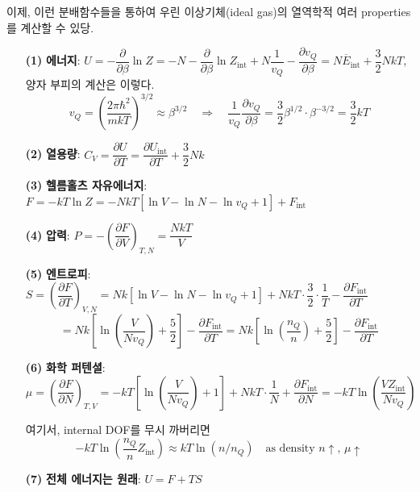 \documentclass{article}
\begin{document}
\noindent
이제, 이런 분배함수들을 통하여 우린 이상기체(ideal gas)의 열역학적 여러 properties를 계산할 수 있당.
\begin{enumerate}
    \item[\textbf{(1)}] \textbf{에너지}: $U = -\dfrac{\partial }{\partial \beta} \ln Z  = -N -\dfrac{\partial }{\partial \beta} \ln Z_{\text{int}} + N\dfrac{1}{v_Q} -\dfrac{\partial v_Q}{\partial \beta} = N \overline{E}_{\text{int}} + \dfrac{3}{2}NkT$, 양자 부피의 계산은 이렇다.
    \begin{equation}
        v_Q = \left( \frac{2\pi \hbar^2}{mkT} \right)^{3/2} \approx \beta^{3/2} \quad \Rightarrow \quad \dfrac{1}{v_Q} \dfrac{\partial v_Q}{\partial \beta} = \frac{3}{2} \beta^{1/2} \cdot \beta^{-3/2} = \frac{3}{2}kT
    \end{equation}

    \item[\textbf{(2)}] \textbf{열용량}: $C_V = \dfrac{\partial U}{\partial T} = \dfrac{\partial U_{\text{int}}}{\partial T}  + \dfrac{3}{2}Nk$

    \item[\textbf{(3)}] \textbf{헬름홀츠 자유에너지}: $F = -kT\ln Z = -NkT [\ln V -\ln N - \ln v_Q + 1] + F_{\text{int}}$

    \item[\textbf{(4)}] \textbf{압력}: $P = - \left( \dfrac{\partial F}{\partial V} \right)_{T,N} = \dfrac{NkT}{V}$

    \item[\textbf{(5)}] \textbf{엔트로피}: $S = \left( \dfrac{\partial F}{\partial T} \right)_{V,N} = Nk [\ln V -\ln N - \ln v_Q + 1] + NkT \cdot \dfrac{3}{2} \cdot \dfrac{1}{T} - \dfrac{\partial F_\text{int}}{\partial T}$
    \begin{equation*}
         = Nk\left[ \ln \left( \frac{V}{Nv_Q} \right) + \frac52 \right] - \dfrac{\partial F_\text{int}}{\partial T} = Nk \left[ \ln \left( \frac{n_Q}{n} \right) + \frac{5}{2} \right]- \dfrac{\partial F_\text{int}}{\partial T}
    \end{equation*}

    \item[\textbf{(6)}] \textbf{화학 퍼텐셜}: $\mu = \left( \dfrac{\partial F}{\partial N} \right)_{T,V} = -kT \left[ \ln \left( \dfrac{V}{Nv_Q} \right) + 1 \right] + NkT \cdot \dfrac{1}{N} + \dfrac{\partial F_\text{int}}{\partial N} = -kT\ln \left( \dfrac{V Z_\text{int}}{Nv_Q} \right)$

    여기서, internal DOF를 무시 까버리면
    \begin{equation}
        -kT\ln \left( \dfrac{n_Q}{n} Z_{\text{int}} \right) \approx kT\ln (n/n_Q) \quad \text{as density $n \uparrow$, $\mu \uparrow$}
    \end{equation}

    \item[\textbf{(7)}] \textbf{전체 에너지는 원래}: $U = F + TS$
\end{enumerate}
\end{document}
